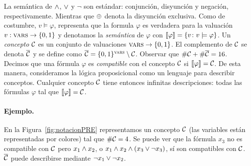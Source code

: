 
La semántica de $\wedge$, $\vee$ y $\lnot$ son estándar: conjunción, disyunción y negación, respectivamente. Mientras que $\oplus$ denota la disyunción exclusiva. Como de costumbre, $v\models \varphi$, representa que la formula $\varphi$ es verdadera para la valuación $v:\textsc{vars}\to\{0,1\}$ y denotamos la {\em semántica} de $\varphi$ con $\llbracket \varphi\rrbracket=\{v\colon v\models\varphi\}$. Un {\em concepto} $\mathcal{C}$ es un conjunto de valuaciones $\textsc{vars}\to\{0,1\}$. El complemento de $\mathcal{C}$ se denota $\overline {\mathcal{C}}$ y se define como $\overline {\mathcal{C}}=\{0,1\}^{\textsc{vars}}\setminus \mathcal{C}$. Observar que $\#\mathcal{C}+\#\overline {\mathcal{C}}=16$. Decimos que una fórmula $\varphi$ es {\em compatible} con el concepto $\mathcal{C}$ si $\llbracket \varphi\rrbracket=\mathcal{C}$. De esta manera, consideramos la lógica proposicional como un lenguaje para describir conceptos. Cualquier concepto $\mathcal{C}$ tiene entonces infinitas descripciones: todas las fórmulas $\varphi$ tal que $\llbracket \varphi\rrbracket=\mathcal{C}$. 




\paragraph*{Ejemplo.}
En la Figura~\ref{fig:notacionPRE} representamos un concepto $\mathcal{C}$ (las variables están representadas por colores) tal que $\#\mathcal{C}=4$. Se puede ver que la fórmula $x_3$ no es compatible con $\mathcal{C}$ pero $x_1 \wedge x_2$, o $x_1 \wedge x_2 \wedge (x_3 \vee \lnot x_3)$, sí son compatibles con $\mathcal{C}$. $\overline {\mathcal{C}}$ puede describirse mediante $\lnot x_1\vee \lnot x_2$.

